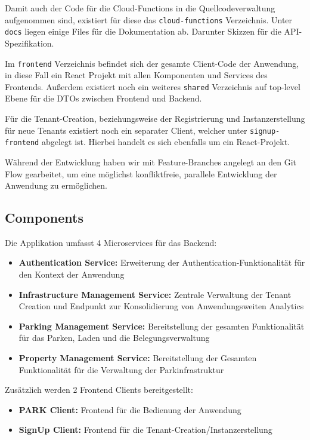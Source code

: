 Damit auch der Code für die Cloud-Functions in die Quellcodeverwaltung aufgenommen sind, existiert für diese das \verb|cloud-functions| Verzeichnis.
Unter \verb|docs| liegen einige Files für die Dokumentation ab. Darunter Skizzen für die API-Spezifikation.

Im \verb|frontend| Verzeichnis befindet sich der gesamte Client-Code der Anwendung, in diese Fall ein React Projekt mit allen Komponenten und Services des Frontends.
Außerdem existiert noch ein weiteres \verb|shared| Verzeichnis auf top-level Ebene für die DTOs zwischen Frontend und Backend.

Für die Tenant-Creation, beziehungsweise der Registrierung und Instanzerstellung für neue Tenants existiert noch ein separater Client, welcher unter \verb|signup-frontend| abgelegt ist. Hierbei handelt es sich ebenfalls um ein React-Projekt.

Während der Entwicklung haben wir mit Feature-Branches angelegt an den Git Flow gearbeitet, um eine möglichst konfliktfreie, parallele Entwicklung der Anwendung zu ermöglichen.

\subsection{Components}
Die Applikation umfasst 4 Microservices für das Backend:

\begin{itemize}
    \item \textbf{Authentication Service:} Erweiterung der Authentication-Funktionalität für den Kontext der Anwendung
    \item \textbf{Infrastructure Management Service:} Zentrale Verwaltung der Tenant Creation und Endpunkt zur Konsolidierung von Anwendungsweiten Analytics
    \item \textbf{Parking Management Service:} Bereitstellung der gesamten Funktionalität für das Parken, Laden und die Belegungsverwaltung
    \item \textbf{Property Management Service:} Bereitstellung der Gesamten Funktionalität für die Verwaltung der Parkinfrastruktur
\end{itemize}

Zusätzlich werden 2 Frontend Clients bereitgestellt:

\begin{itemize}
    \item \textbf{PARK Client:} Frontend für die Bedienung der Anwendung
    \item \textbf{SignUp Client:} Frontend für die Tenant-Creation/Instanzerstellung
\end{itemize}

